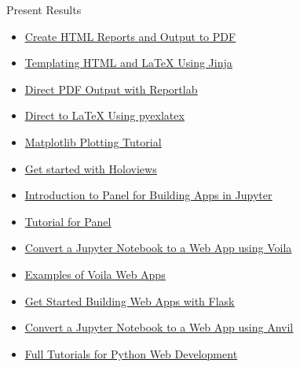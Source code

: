 \documentclass[handout, 11pt]{beamer}
\begin{document}
\begin{section}{Present Results}
\begin{frame}
\begin{itemize}
\vfill
\item \textcolor{blue}{\underline{\href{https://towardsdatascience.com/creating-pdf-reports-with-python-pdfkit-and-jinja2-templates-64a89158fa2d}{Create HTML Reports and Output to PDF}}}
\vfill
\item \textcolor{blue}{\underline{\href{https://realpython.com/primer-on-jinja-templating/}{Templating HTML and LaTeX Using Jinja}}}
\vfill
\item \textcolor{blue}{\underline{\href{https://www.reportlab.com/docs/reportlab-userguide.pdf}{Direct PDF Output with Reportlab}}}
\vfill
\item \textcolor{blue}{\underline{\href{https://nickderobertis.github.io/py-ex-latex/}{Direct to LaTeX Using pyexlatex}}}
\vfill
\item \textcolor{blue}{\underline{\href{https://www.datacamp.com/community/tutorials/matplotlib-tutorial-python}{Matplotlib Plotting Tutorial}}}
\vfill
\item \textcolor{blue}{\underline{\href{https://holoviews.org/getting\_started/index.html}{Get started with Holoviews}}}
\vfill
\item \textcolor{blue}{\underline{\href{https://www.youtube.com/watch?v=L91rd1D6XTA\&ab\_channel=Enthought}{Introduction to Panel for Building Apps in Jupyter}}}
\vfill
\item \textcolor{blue}{\underline{\href{https://panel.holoviz.org/getting\_started/index.html}{Tutorial for Panel}}}
\vfill
\item \textcolor{blue}{\underline{\href{https://voila.readthedocs.io/en/stable/}{Convert a Jupyter Notebook to a Web App using Voila}}}
\vfill
\item \textcolor{blue}{\underline{\href{https://voila-gallery.org/services/gallery/}{Examples of Voila Web Apps}}}
\vfill
\item \textcolor{blue}{\underline{\href{https://scotch.io/tutorials/getting-started-with-flask-a-python-microframework}{Get Started Building Web Apps with Flask}}}
\vfill
\item \textcolor{blue}{\underline{\href{https://anvil.works/learn/tutorials/jupyter-notebook-to-web-app}{Convert a Jupyter Notebook to a Web App using Anvil}}}
\vfill
\item \textcolor{blue}{\underline{\href{https://www.fullstackpython.com/}{Full Tutorials for Python Web Development}}}
\end{itemize}
\end{frame}
\end{section}
\end{document}
